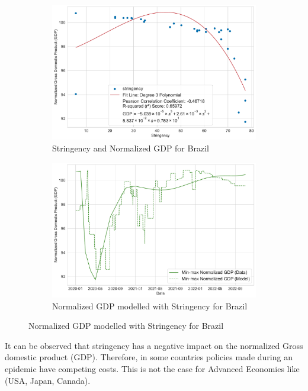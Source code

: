 \documentclass[tikz,fleqn,12pt]{wlscirep}
\begin{document}
\begin{figure}[htbp!]
  \begin{subfigure}[t]{0.48\textwidth}
    \centering
    \includegraphics[width=\linewidth]{images/stringency_vs_gdp_BRA.pdf}
    \caption{Stringency and Normalized GDP for Brazil}
  \end{subfigure}
  \label{fig:stringency_vs_gdp_BRA}
  \hfill
  \begin{subfigure}[t]{0.48\textwidth}
    \centering
    \includegraphics[width=\linewidth]{images/gdp_modelled_with_stringency_BRA.pdf}
    \caption{Normalized GDP modelled with Stringency for Brazil}
  \end{subfigure}
  \label{fig:gdp_modelled_with_stringency_BRA}
\end{figure}
It can be observed that stringency has a negative impact on the normalized Gross domestic product (GDP). Therefore, in some countries policies made during an epidemic have competing costs. This is not the case for Advanced Economies like (USA, Japan, Canada).
\end{document}
